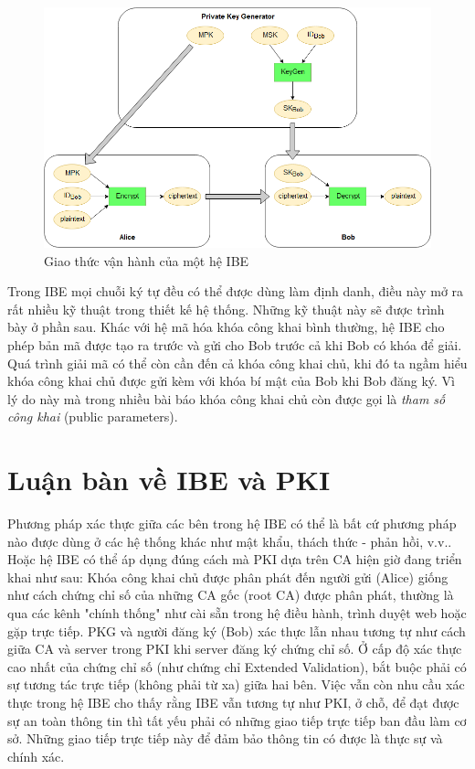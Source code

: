 \documentclass[class=report, crop=false]{standalone}
\begin{document}
		\begin{figure}[h]
			\captionsetup{font=normalsize}
			\includegraphics[width=\textwidth]{ibe_protocol.png}
			\centering
			\caption{Giao thức vận hành của một hệ IBE}
		\end{figure}
		\newpage
		Trong IBE mọi chuỗi ký tự đều có thể được dùng làm định danh, điều này mở ra rất nhiều kỹ thuật trong thiết kế hệ thống. Những kỹ thuật này sẽ được trình bày ở phần sau. Khác với hệ mã hóa khóa công khai bình thường, hệ IBE cho phép bản mã được tạo ra trước và gửi cho Bob trước cả khi Bob có khóa để giải. Quá trình giải mã có thể còn cần đến cả khóa công khai chủ, khi đó ta ngầm hiểu khóa công khai chủ được gửi kèm với khóa bí mật của Bob khi Bob đăng ký. Vì lý do này mà trong nhiều bài báo khóa công khai chủ còn được gọi là \textit{tham số công khai} (public parameters).
	\section{Luận bàn về IBE và PKI}\label{fig:ibe_vs_pki}
		Phương pháp xác thực giữa các bên trong hệ IBE có thể là bất cứ phương pháp nào được dùng ở các hệ thống khác như mật khẩu, thách thức - phản hồi, v.v.. Hoặc hệ IBE có thể áp dụng đúng cách mà PKI dựa trên CA hiện giờ đang triển khai như sau: Khóa công khai chủ được phân phát đến người gửi (Alice) giống như cách chứng chỉ số của những CA gốc (root CA) được phân phát, thường là qua các kênh "chính thống" như cài sẵn trong hệ điều hành, trình duyệt web hoặc gặp trực tiếp. PKG và người đăng ký (Bob) xác thực lẫn nhau tương tự như cách giữa CA và server trong PKI khi server đăng ký chứng chỉ số. Ở cấp độ xác thực cao nhất của chứng chỉ số (như chứng chỉ Extended Validation), bắt buộc phải có sự tương tác trực tiếp (không phải từ xa) giữa hai bên. Việc vẫn còn nhu cầu xác thực trong hệ IBE cho thấy rằng IBE vẫn tương tự như PKI, ở chỗ, để đạt được sự an toàn thông tin thì tất yếu phải có những giao tiếp trực tiếp ban đầu làm cơ sở. Những giao tiếp trực tiếp này để đảm bảo thông tin có được là thực sự và chính xác.
		
\end{document}
